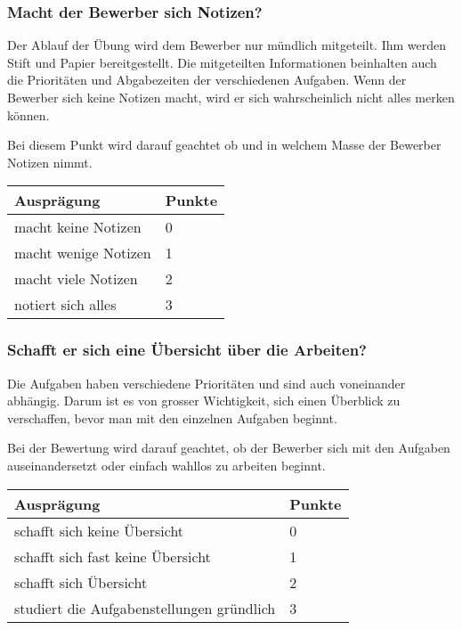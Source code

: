 \subsubsection{Macht der Bewerber sich Notizen?}
Der Ablauf der Übung wird dem Bewerber nur mündlich mitgeteilt. Ihm werden Stift und Papier bereitgestellt. Die mitgeteilten Informationen beinhalten auch die Prioritäten und Abgabezeiten der verschiedenen Aufgaben. Wenn der Bewerber sich keine Notizen macht, wird er sich wahrscheinlich nicht alles merken können. 

Bei diesem Punkt wird darauf geachtet ob und in welchem Masse der Bewerber Notizen nimmt.

\begin{center}
  \begin{tabular}{ | p{5cm} | p{1cm} |}
   \hline
   \textbf{Ausprägung} & \textbf{Punkte} \\ \hline
   macht keine Notizen & 0 \\ \hline
   macht wenige Notizen & 1 \\ \hline
   macht viele Notizen & 2 \\ \hline
   notiert sich alles  & 3\\ \hline
  \end{tabular}
\end{center}


\subsubsection{Schafft er sich eine Übersicht über die Arbeiten?}
Die Aufgaben haben verschiedene Prioritäten und sind auch voneinander abhängig. Darum ist es von grosser Wichtigkeit, sich einen Überblick zu verschaffen, bevor man mit den einzelnen Aufgaben beginnt.

Bei der Bewertung wird darauf geachtet, ob der Bewerber sich mit den Aufgaben auseinandersetzt oder einfach wahllos zu arbeiten beginnt.

\begin{center}
  \begin{tabular}{ | p{6.5cm} | p{1cm} |}
   \hline
   \textbf{Ausprägung} & \textbf{Punkte} \\ \hline
   schafft sich keine Übersicht & 0 \\ \hline
   schafft sich fast keine Übersicht & 1 \\ \hline
   schafft sich Übersicht & 2 \\ \hline
   studiert die Aufgabenstellungen gründlich  & 3\\ \hline
  \end{tabular}
\end{center}

